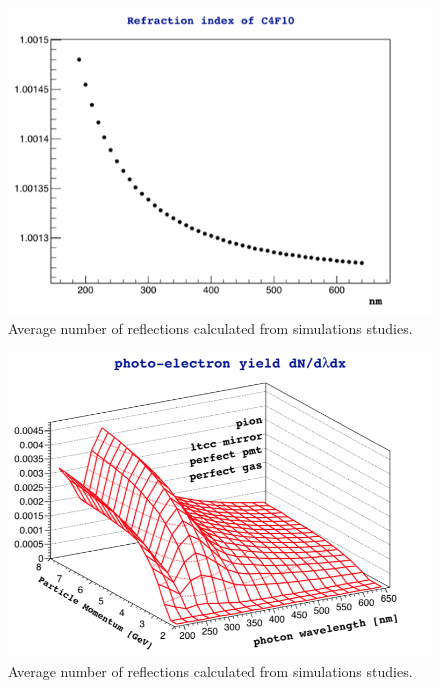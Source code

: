 \begin{figure}[hbt]
	\centering
	\includegraphics[width=1.0\columnwidth,keepaspectratio]{img/c4f10RefrIndex.png}
	\caption{Average number of reflections calculated from simulations studies.}
	\label{fig:c4f10RefrIndex}
\end{figure}

\begin{figure}[hbt]
	\centering
	\includegraphics[width=1.0\columnwidth,keepaspectratio]{img/photonYieldStudy.png}
	\caption{Average number of reflections calculated from simulations studies.}
	\label{fig:photonYieldStudy}
\end{figure}


